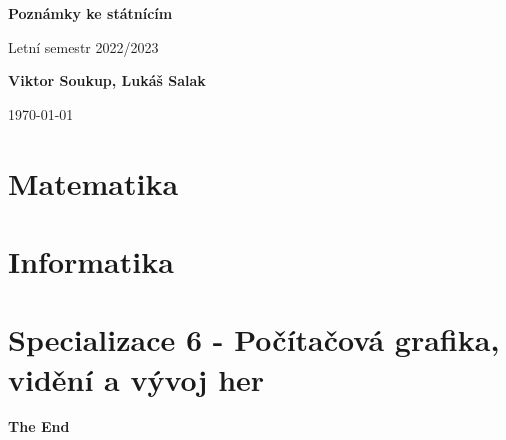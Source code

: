 \documentclass[12pt]{article}
\theoremstyle{nontheoremstyle}
\theoremstyle{nontheoremstylenodot}
\theoremstyle{theoremstyle}
\begin{document}
\begin{titlepage}
    \begin{center}
        \vspace*{1cm}
            
        \Huge
        \textbf{Poznámky ke státnícím}


        \vspace{3mm}
        Letní semestr 2022/2023
        
        \vspace{1.5cm}
            
        \textbf{Viktor Soukup, Lukáš Salak}
        
        \vfill
        \flushright
        \normalsize
        \today
        
    \end{center}
\end{titlepage}

\tableofcontents


\part{Matematika}








\part{Informatika}






\part{Specializace 6 - Počítačová grafika, vidění a vývoj her}








\vfill
\begin{center}
\LARGE
\textbf{The End}
\end{center}
\end{document}
